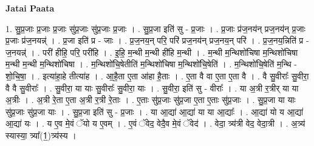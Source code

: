 \documentclass[17pt]{extarticle}
\begin{document}
\textbf{Jatai Paata} \newline

1. सु॒प्र॒जाः प्र॒जाः प्र॒जाः सु॑प्र॒जाः सु॑प्र॒जाः प्र॒जाः । . सु॒प्र॒जा इति॑ सु - प्र॒जाः । . प्र॒जाः प्र॑ज॒नय॑न् प्रज॒नय॑न् प्र॒जाः प्र॒जाः प्र॑ज॒नयन्न्॑ । . प्र॒जा इति॑ प्र - जाः । . प्र॒ज॒नय॒न् परि॒ परि॑ प्रज॒नय॑न् प्रज॒नय॒न् परि॑ । . प्र॒ज॒नय॒न्निति॑ प्र - ज॒नयन्न्॑ । . परी॑ हीहि॒ परि॒ परी॑हि । . इ॒हि॒ म॒न्थी म॒न्थी ही॑हि म॒न्थी । . म॒न्थी म॒न्थिशो॑चिषा म॒न्थिशो॑चिषा म॒न्थी म॒न्थी म॒न्थिशो॑चिषा । . म॒न्थिशो॑चि॒षेतीति॑ म॒न्थिशो॑चिषा म॒न्थिशो॑चि॒षेति॑ । . म॒न्थिशो॑चि॒षेति॑ म॒न्थि - शो॒चि॒षा॒ । . इत्या॑हा॒हे तीत्या॑ह । . आ॒है॒ता ए॒ता आ॑हा है॒ताः । . ए॒ता वै वा ए॒ता ए॒ता वै । . वै सु॒वीराः᳚ सु॒वीरा॒ वै वै सु॒वीराः᳚ । . सु॒वीरा॒ या याः सु॒वीराः᳚ सु॒वीरा॒ याः । . सु॒वीरा॒ इति॑ सु - वीराः᳚ । . या अ॒त्री र॒त्रीर् या या अ॒त्रीः । . अ॒त्री रे॒ता ए॒ता अ॒त्री र॒त्री रे॒ताः । . ए॒ताः सु॑प्र॒जाः सु॑प्र॒जा ए॒ता ए॒ताः सु॑प्र॒जाः । . सु॒प्र॒जा या याः सु॑प्र॒जाः सु॑प्र॒जा याः । . सु॒प्र॒जा इति॑ सु - प्र॒जाः । . या आ॒द्या॑ आ॒द्या॑ या या आ॒द्याः᳚ । . आ॒द्या॑ यो य आ॒द्या॑ आ॒द्या॑ यः । . य ए॒व मे॒वं ॅयो य ए॒वम् । . ए॒वं ॅवेद॒ वेदै॒व मे॒वं ॅवेद॑ । . वेदा॒ त्र्य॑त्री वेद॒ वेदा॒त्री । . अ॒त्र्य॑ स्यास्या॒ त्र्या᳚(1॒)त्र्य॑स्य । \newline
\end{document}
